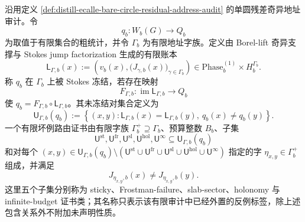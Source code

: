 \begin{definition}\label{distill:ecalle_resurgence_mould_calculus_and_alien_derivatives-apparent_randomness_freezing_by_stokes_data-finite-stokes-freezing-audit}
沿用定义 \ref{def:distill-ecalle-bare-circle-residual-address-audit} 的单圆残差奇异地址审计。令
\[
q_b:W_b(G)\longrightarrow Q_b
\]
为取值于有限集合的粗统计，并令 \(\Gamma_b\) 为有限地址字族。定义由 Borel-lift 奇异支撑与 Stokes jump factorization 生成的有限账本
\[
\mathsf L_{\Gamma,b}(x)
:=
\left(v_b(x),\bigl(J_{\gamma,b}(x)\bigr)_{\gamma\in\Gamma_b}\right)
\in
\mathrm{Phase}_b^{(1)}\times H_b^{\Gamma_b}.
\]
称 \(q_b\) 在 \(\Gamma_b\) 上被 Stokes 冻结，若存在映射
\[
F_{\Gamma,b}:\operatorname{im}\mathsf L_{\Gamma,b}\longrightarrow Q_b
\]
使 \(q_b=F_{\Gamma,b}\circ\mathsf L_{\Gamma,b}\)。其未冻结对集合定义为
\[
\mathsf U_{\Gamma,b}(q_b)
:=
\left\{(x,y):\mathsf L_{\Gamma,b}(x)=\mathsf L_{\Gamma,b}(y),\ q_b(x)\ne q_b(y)\right\}.
\]
一个有限坏例路由证书由有限字族 \(\Gamma_b^+\supseteq\Gamma_b\)、预算整数 \(B_b\)、子集
\[
\mathsf U^{\mathrm{st}},\mathsf U^{\mathrm{fr}},\mathsf U^{\mathrm{sl}},\mathsf U^{\mathrm{hol}},\mathsf U^{\infty}
\subseteq
\mathsf U_{\Gamma,b}(q_b)
\]
和对每个
\((x,y)\in\mathsf U_{\Gamma,b}(q_b)\setminus
(\mathsf U^{\mathrm{st}}\cup\mathsf U^{\mathrm{fr}}\cup\mathsf U^{\mathrm{sl}}\cup\mathsf U^{\mathrm{hol}}\cup\mathsf U^{\infty})
\)
指定的字 \(\eta_{x,y}\in\Gamma_b^+\) 组成，并满足
\[
J_{\eta_{x,y},b}(x)\ne J_{\eta_{x,y},b}(y).
\]
这里五个子集分别称为 sticky、Frostman-failure、slab-sector、holonomy 与 infinite-budget 证书类；其名称只表示该有限审计中已经外置的反例标签，除上述包含关系外不附加未声明性质。
\end{definition}

